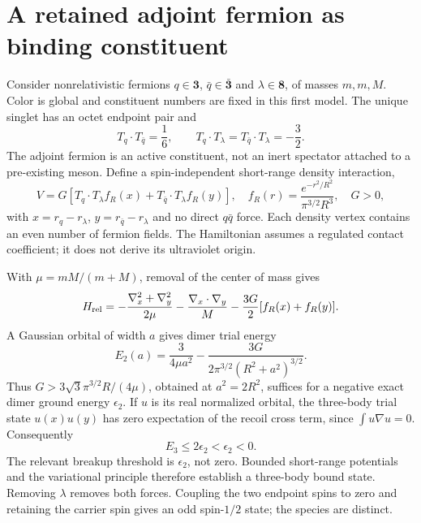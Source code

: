 \section{A retained adjoint fermion as binding constituent}
\label{sec:retained}
Consider nonrelativistic fermions $q\in\mathbf3$, $\bar q\in\bar{\mathbf3}$ and $\lambda\in\mathbf8$, of masses $m,m,M$. Color is global and constituent numbers are fixed in this first model. The unique singlet has an octet endpoint pair and
\begin{equation}
 T_q\cdot T_{\bar q}=\frac16,\qquad
 T_q\cdot T_\lambda=T_{\bar q}\cdot T_\lambda=-\frac32.
\end{equation}
The adjoint fermion is an active constituent, not an inert spectator attached to a pre-existing meson. Define a spin-independent short-range density interaction,
\begin{equation}
 V=G[T_q\cdot T_\lambda f_R(x)+T_{\bar q}\cdot T_\lambda f_R(y)],
 \quad f_R(r)=\frac{e^{-r^2/R^2}}{\pi^{3/2}R^3},\quad G>0,
 \label{eq:contact-trimer}
\end{equation}
with $x=r_q-r_\lambda$, $y=r_{\bar q}-r_\lambda$ and no direct $q\bar q$ force. Each density vertex contains an even number of fermion fields. The Hamiltonian assumes a regulated contact coefficient; it does not derive its ultraviolet origin.

With $\mu=mM/(m+M)$, removal of the center of mass gives
\begin{equation}
 H_{\rm rel}=-\frac{\nabla_x^2+\nabla_y^2}{2\mu}
 -\frac{\nabla_x\cdot\nabla_y}{M}
 -\frac{3G}{2}[f_R(x)+f_R(y)].
\end{equation}
A Gaussian orbital of width $a$ gives dimer trial energy
\begin{equation}
 E_2(a)=\frac{3}{4\mu a^2}
 -\frac{3G}{2\pi^{3/2}(R^2+a^2)^{3/2}}.
\end{equation}
Thus $G>3\sqrt3\pi^{3/2}R/(4\mu)$, obtained at $a^2=2R^2$, suffices for a negative exact dimer ground energy $\epsilon_2$. If $u$ is its real normalized orbital, the three-body trial state $u(x)u(y)$ has zero expectation of the recoil cross term, since $\int u\nabla u=0$. Consequently
\begin{equation}
 \boxed{E_3\leq2\epsilon_2<\epsilon_2<0.}
 \label{eq:trimer-proof}
\end{equation}
The relevant breakup threshold is $\epsilon_2$, not zero. Bounded short-range potentials and the variational principle therefore establish a three-body bound state. Removing $\lambda$ removes both forces. Coupling the two endpoint spins to zero and retaining the carrier spin gives an odd spin-$1/2$ state; the species are distinct.

